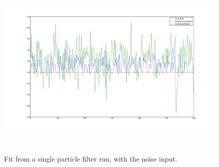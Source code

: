 \begin{figure}[H]
\centering
\includegraphics[clip=true,trim=6cm 3cm 6cm 3cm,height=9cm]{images/justbignoise_fit_0}
\caption{Fit from a single particle filter run, with the noise input. }
\label{fig:justbignoise_fit_0}
\end{figure} %


